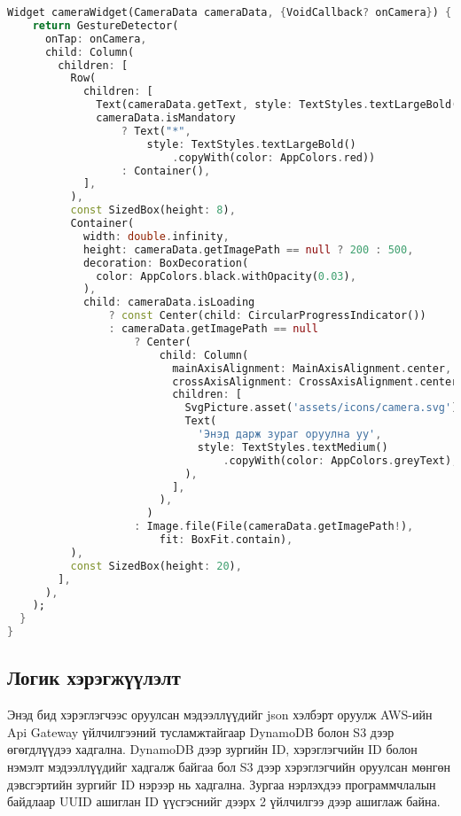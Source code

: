 \begin{lstlisting}[language=Dart, caption=Data Spider нүүр хуудасны хэрэгжүүлэлт, frame=single]
  Widget cameraWidget(CameraData cameraData, {VoidCallback? onCamera}) {
    return GestureDetector(
      onTap: onCamera,
      child: Column(
        children: [
          Row(
            children: [
              Text(cameraData.getText, style: TextStyles.textLargeBold()),
              cameraData.isMandatory
                  ? Text("*",
                      style: TextStyles.textLargeBold()
                          .copyWith(color: AppColors.red))
                  : Container(),
            ],
          ),
          const SizedBox(height: 8),
          Container(
            width: double.infinity,
            height: cameraData.getImagePath == null ? 200 : 500,
            decoration: BoxDecoration(
              color: AppColors.black.withOpacity(0.03),
            ),
            child: cameraData.isLoading
                ? const Center(child: CircularProgressIndicator())
                : cameraData.getImagePath == null
                    ? Center(
                        child: Column(
                          mainAxisAlignment: MainAxisAlignment.center,
                          crossAxisAlignment: CrossAxisAlignment.center,
                          children: [
                            SvgPicture.asset('assets/icons/camera.svg'),
                            Text(
                              'Энэд дарж зураг оруулна уу',
                              style: TextStyles.textMedium()
                                  .copyWith(color: AppColors.greyText),
                            ),
                          ],
                        ),
                      )
                    : Image.file(File(cameraData.getImagePath!),
                        fit: BoxFit.contain),
          ),
          const SizedBox(height: 20),
        ],
      ),
    );
  }
}

\end{lstlisting}

\subsection{Логик хэрэгжүүлэлт}

Энэд бид хэрэглэгчээс оруулсан мэдээллүүдийг json хэлбэрт оруулж AWS-ийн Api Gateway үйлчилгээний тусламжтайгаар DynamoDB болон S3 дээр өгөгдлүүдээ хадгална. DynamoDB дээр зургийн ID, хэрэглэгчийн ID болон нэмэлт мэдээллүүдийг хадгалж байгаа бол S3 дээр хэрэглэгчийн оруулсан мөнгөн дэвсгэртийн зургийг ID нэрээр нь хадгална. Зургаа нэрлэхдээ программчлалын байдлаар UUID ашиглан ID үүсгэснийг дээрх 2 үйлчилгээ дээр ашиглаж байна.

